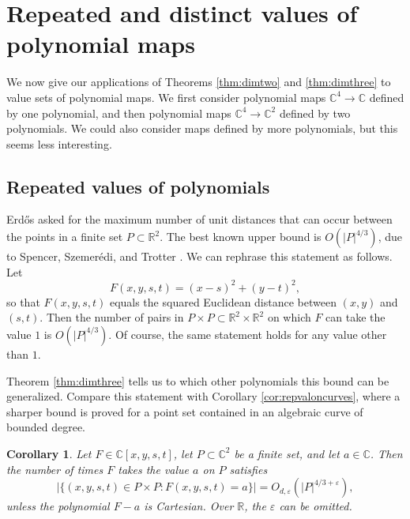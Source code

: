 \documentclass{daj}
\newtheorem{corollary}[theorem]{Corollary}
\theoremstyle{definition}
\newcommand{\C}{\mathbb C}
\newcommand{\R}{\mathbb R}
\newcommand{\eps}{\varepsilon}
\begin{document}


\section{Repeated and distinct values of polynomial maps}
\label{sec:repeateddistinct}

We now give our applications of Theorems \ref{thm:dimtwo} and \ref{thm:dimthree} to value sets of polynomial maps.
We first consider polynomial maps $\C^4\to \C$ defined by one polynomial, and then polynomial maps $\C^4\to\C^2$ defined by two polynomials.
We could also consider maps defined by more polynomials, but this seems less interesting.

\subsection{Repeated values of polynomials}
\label{subsec:repeatedpoly}
Erd\H os \cite{Er} asked for the maximum number of unit distances that can occur between the points in a finite set $P\subset \R^2$. 
The best known upper bound is $O(|P|^{4/3})$, due to Spencer, Szemer\'edi, and Trotter \cite{SST}.
We can rephrase this statement as follows.
Let
\[F(x,y,s,t) = (x-s)^2 + (y-t)^2,\]
so that $F(x,y,s,t)$ equals the squared Euclidean distance between $(x,y)$ and $(s,t)$.
Then the number of pairs in  $P\times P\subset \R^2\times \R^2$ on which $F$ can take the value $1$ is $O(|P|^{4/3})$.
Of course, the same statement holds for any value other than $1$.

Theorem \ref{thm:dimthree} tells us to which other polynomials this bound can be generalized.
Compare this statement with Corollary \ref{cor:repvaloncurves}, 
where a sharper bound is proved for a point set contained in an algebraic curve of bounded degree.

\begin{corollary}\label{cor:repeated}
Let $F\in \C[x,y,s,t]$, let $P\subset \C^2$ be a finite set, and let $a\in \C$.
Then the number of times $F$ takes the value $a$ on $P$ satisfies
\[|\{(x,y,s,t)\in P\times P: F(x,y,s,t)=a\}| = O_{d,\eps}(|P|^{4/3+\eps}),\]
unless the polynomial $F-a$ is Cartesian. 
Over $\R$, the $\eps$ can be omitted.
\end{corollary}
\end{document}

